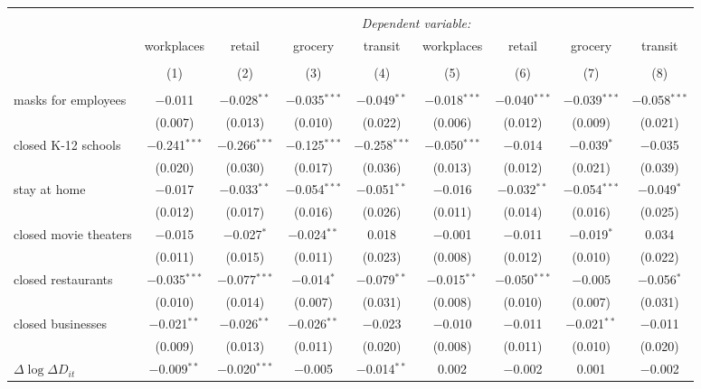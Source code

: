 \begin{tabular}{@{\extracolsep{1pt}}lcccccccc} 
\\[-1.8ex]\hline 
\hline \\[-1.8ex] 
 & \multicolumn{8}{c}{\textit{Dependent variable:}} \\ 
\cline{2-9} 
 & workplaces & retail & grocery & transit & workplaces & retail & grocery & transit \\ 
\\[-1.8ex] & (1) & (2) & (3) & (4) & (5) & (6) & (7) & (8)\\ 
\hline \\[-1.8ex] 
 masks for employees & $-$0.011 & $-$0.028$^{**}$ & $-$0.035$^{***}$ & $-$0.049$^{**}$ & $-$0.018$^{***}$ & $-$0.040$^{***}$ & $-$0.039$^{***}$ & $-$0.058$^{***}$ \\ 
  & (0.007) & (0.013) & (0.010) & (0.022) & (0.006) & (0.012) & (0.009) & (0.021) \\ 
  closed K-12 schools & $-$0.241$^{***}$ & $-$0.266$^{***}$ & $-$0.125$^{***}$ & $-$0.258$^{***}$ & $-$0.050$^{***}$ & $-$0.014 & $-$0.039$^{*}$ & $-$0.035 \\ 
  & (0.020) & (0.030) & (0.017) & (0.036) & (0.013) & (0.012) & (0.021) & (0.039) \\ 
  stay at home & $-$0.017 & $-$0.033$^{**}$ & $-$0.054$^{***}$ & $-$0.051$^{**}$ & $-$0.016 & $-$0.032$^{**}$ & $-$0.054$^{***}$ & $-$0.049$^{*}$ \\ 
  & (0.012) & (0.017) & (0.016) & (0.026) & (0.011) & (0.014) & (0.016) & (0.025) \\ 
  closed movie theaters & $-$0.015 & $-$0.027$^{*}$ & $-$0.024$^{**}$ & 0.018 & $-$0.001 & $-$0.011 & $-$0.019$^{*}$ & 0.034 \\ 
  & (0.011) & (0.015) & (0.011) & (0.023) & (0.008) & (0.012) & (0.010) & (0.022) \\ 
  closed restaurants & $-$0.035$^{***}$ & $-$0.077$^{***}$ & $-$0.014$^{*}$ & $-$0.079$^{**}$ & $-$0.015$^{**}$ & $-$0.050$^{***}$ & $-$0.005 & $-$0.056$^{*}$ \\ 
  & (0.010) & (0.014) & (0.007) & (0.031) & (0.008) & (0.010) & (0.007) & (0.031) \\ 
  closed businesses & $-$0.021$^{**}$ & $-$0.026$^{**}$ & $-$0.026$^{**}$ & $-$0.023 & $-$0.010 & $-$0.011 & $-$0.021$^{**}$ & $-$0.011 \\ 
  & (0.009) & (0.013) & (0.011) & (0.020) & (0.008) & (0.011) & (0.010) & (0.020) \\ 
  $\Delta \log \Delta D_{it}$ & $-$0.009$^{**}$ & $-$0.020$^{***}$ & $-$0.005 & $-$0.014$^{**}$ & 0.002 & $-$0.002 & 0.001 & $-$0.002 \\ 

\end{tabular}
